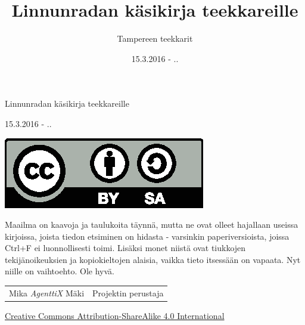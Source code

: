 \documentclass[a4paper,12pt,finnish]{book}
\title{Linnunradan käsikirja teekkareille}
\author{Tampereen teekkarit}
\date{15.3.2016 - \the\day.\the\month.\the\year}
\begin{document}
\begin{titlepage}
\centering
{\huge Linnunradan käsikirja teekkareille \par}
{15.3.2016 - \the\day.\the\month.\the\year \par}
\vfill
\includegraphics{by-sa.eps}
\end{titlepage}

Maailma on kaavoja ja taulukoita täynnä, mutta ne ovat olleet hajallaan useissa kirjoissa, joista tiedon etsiminen on hidasta - varsinkin paperiversioista, joissa Ctrl+F ei luonnollisesti toimi. Lisäksi monet niistä ovat tiukkojen tekijänoikeuksien ja kopiokieltojen alaisia, vaikka tieto itsessään on vapaata. Nyt niille on vaihtoehto. Ole hyvä.

\begin{table}[h!]
\centering
\begin{tabular}{ll}
Mika \textit{AgenttiX} Mäki	& Projektin perustaja \\
\end{tabular}
\end{table}

\vfill
\href{https://creativecommons.org/licenses/by-sa/4.0/}{Creative Commons Attribution-ShareAlike 4.0 International}

\tableofcontents






\end{document}
